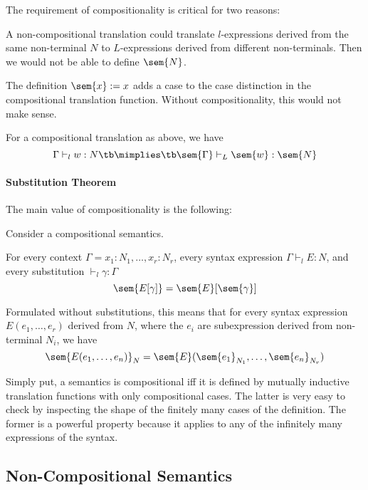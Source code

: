 The requirement of compositionality is critical for two reasons:
\begin{compactitem}
\item A non-compositional translation could translate $l$-expressions derived from the same non-terminal $N$ to $L$-expressions derived from different non-terminals. Then we would not be able to define $\sem{N}$.
\item The definition $\sem{x}:=x$ adds a case to the case distinction in the compositional translation function.
Without compositionality, this would not make sense.
\end{compactitem}

\begin{theorem}
For a compositional translation as above, we have
  \[\Gamma\vdash_l w:N \tb\mimplies\tb \sem{\Gamma}\vdash_L \sem{w}:\sem{N}\]
\end{theorem}

\paragraph{Substitution Theorem}
The main value of compositionality is the following:
\begin{theorem}
Consider a compositional semantics.

For every context $\Gamma=x_1:N_1,\ldots,x_r:N_r$, every syntax expression $\Gamma \vdash_l E:N$,
and every substitution $\vdash_l \gamma:\Gamma$
\[\sem{E[\gamma]}=\sem{E}[\sem{\gamma}]\]
\end{theorem}

Formulated without substitutions, this means that for every syntax expression $E(e_1,\ldots,e_r)$ derived from $N$, where the $e_i$ are subexpression derived from non-terminal $N_i$, we have
\[\sem{E(e_1,\ldots,e_n)}_N=\sem{E}(\sem{e_1}_{N_1},\ldots,\sem{e_n}_{N_r})\]

Simply put, a semantics is compositional iff it is defined by mutually inductive translation functions with only compositional cases.
The latter is very easy to check by inspecting the shape of the finitely many cases of the definition.
The former is a powerful property because it applies to any of the infinitely many expressions of the syntax.

\subsection{Non-Compositional Semantics}

